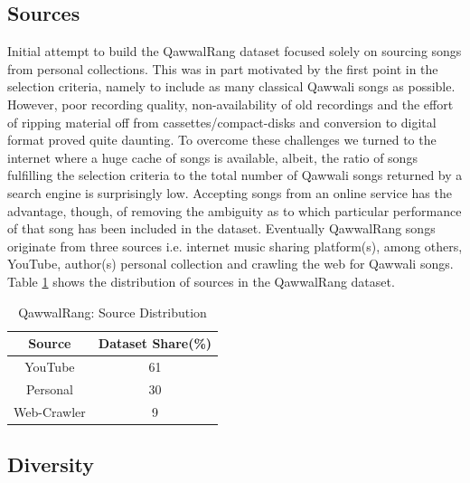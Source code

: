 \documentclass{article}
\begin{document}
\subsection{Sources}
Initial attempt to build the QawwalRang dataset focused solely on sourcing songs from personal collections. This was in part motivated by the first point in the selection criteria, namely to include as many classical Qawwali songs as possible. However, poor recording quality, non-availability of old recordings and the effort of ripping material off from cassettes/compact-disks and conversion to digital format proved quite daunting. To overcome these challenges we turned to the internet where a huge cache of songs is available, albeit, the ratio of songs fulfilling the selection criteria to the total number of Qawwali songs returned by a search engine is surprisingly low. Accepting songs from an online service has the advantage, though, of removing the ambiguity as to which particular performance of that song has been included in the dataset. Eventually QawwalRang songs originate from three sources i.e. internet music sharing platform(s), among others, YouTube, author(s) personal collection and crawling the web for Qawwali songs. Table \ref{tab:sources} shows the distribution of sources in the QawwalRang dataset.
\begin{table}[htpb]
\centering
  \begin{tabular}{|c | c|}
  \toprule
  \bfseries Source & \bfseries Dataset Share(\%) \\
  \hline \hline
  YouTube  & 61 \\
  \hline
  Personal & 30 \\
  \hline
  Web-Crawler & 9  \\
  \bottomrule
  \end{tabular}
  \caption{QawwalRang: Source Distribution}
\label{tab:sources}
\end{table}

\subsection{Diversity}
\end{document}
